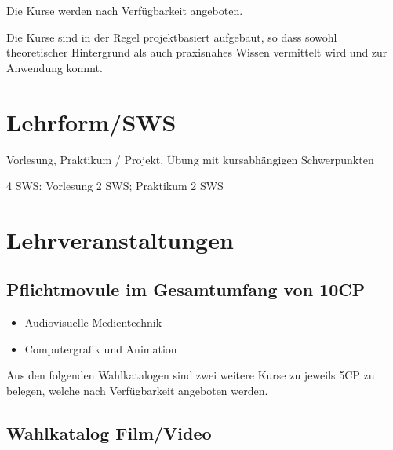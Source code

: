 Die Kurse werden nach Verfügbarkeit angeboten.

Die Kurse sind in der Regel projektbasiert aufgebaut, so dass sowohl
theoretischer Hintergrund als auch praxisnahes Wissen vermittelt wird
und zur Anwendung kommt.

\section*{Lehrform/SWS\label{/mi-2017/modulbeschreibungen-bachelor/BA_Vertiefung-Visual-Computing}}\label{lehrformswspathlabelmi-2017modulbeschreibungen-bachelorbaux5fvertiefung-visual-computing}

Vorlesung, Praktikum / Projekt, Übung mit kursabhängigen Schwerpunkten

4 SWS: Vorlesung 2 SWS; Praktikum 2 SWS

\section*{Lehrveranstaltungen\label{/mi-2017/modulbeschreibungen-bachelor/BA_Vertiefung-Visual-Computing}}\label{lehrveranstaltungenpathlabelmi-2017modulbeschreibungen-bachelorbaux5fvertiefung-visual-computing}

\subsection*{Pflichtmovule im Gesamtumfang von
10CP\label{/mi-2017/modulbeschreibungen-bachelor/BA_Vertiefung-Visual-Computing}}\label{pflichtmovule-im-gesamtumfang-von-10cppathlabelmi-2017modulbeschreibungen-bachelorbaux5fvertiefung-visual-computing}

\begin{itemize}
\tightlist
\item
  Audiovisuelle Medientechnik
\item
  Computergrafik und Animation
\end{itemize}

Aus den folgenden Wahlkatalogen sind zwei weitere Kurse zu jeweils 5CP
zu belegen, welche nach Verfügbarkeit angeboten werden.

\subsection*{Wahlkatalog
Film/Video\label{/mi-2017/modulbeschreibungen-bachelor/BA_Vertiefung-Visual-Computing}}\label{wahlkatalog-filmvideopathlabelmi-2017modulbeschreibungen-bachelorbaux5fvertiefung-visual-computing}

